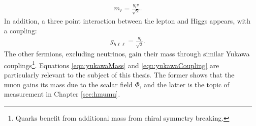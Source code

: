 \begin{equation}\begin{split}\label{eqn:yukawaMass}
    m_\ell=\frac{y_iv}{\sqrt{2}}.
\end{split}\end{equation}
In addition, a three point interaction between the lepton and Higgs appears, with a coupling:
\begin{equation}\begin{split}\label{eqn:yukawaCoupling}
    g_{h\ell\ell}=\frac{y_i}{\sqrt{2}}.
\end{split}\end{equation}
The other fermions, excluding neutrinos, gain their mass through similar Yukawa couplings\footnote{Quarks benefit from additional mass from chiral symmetry breaking.}.
Equations \ref{eqn:yukawaMass} and \ref{eqn:yukawaCoupling} are particularly relevant to the subject of this thesis.
The former shows that the muon gains its mass due to the scalar field $\Phi$, and the latter is the topic of measurement in Chapter \ref{sec:hmumu}.



